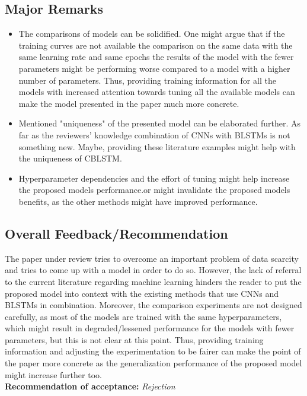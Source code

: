 \documentclass[a4paper,9pt]{article}
\begin{document}
\subsection{Major Remarks}
\begin{itemize}
    \item The comparisons of models can be solidified. One might argue that if the training curves are not available the comparison on the same data with the same learning rate and same epochs the results of the model with the fewer parameters might be performing worse compared to a model with a higher number of parameters. Thus, providing training information for all the models with increased attention towards tuning all the available models can make the model presented in the paper much more concrete.
    \item Mentioned "uniqueness" of the presented model can be elaborated further. As far as the reviewers' knowledge combination of CNNs with BLSTMs is not something new. Maybe, providing these literature examples might help with the uniqueness of CBLSTM.
    \item Hyperparameter dependencies and the effort of tuning might help increase the proposed models performance.or might invalidate the proposed models benefits, as the other methods might have improved performance.
\end{itemize}

\subsection{Overall Feedback/Recommendation}
The paper under review tries to overcome an important problem of data scarcity and tries to come up with a model in order to do so. However, the lack of referral to the current literature regarding machine learning hinders the reader to put the proposed model into context with the existing methods that use CNNs and BLSTMs in combination. Moreover, the comparison experiments are not designed carefully, as most of the models are trained with the same hyperparameters, which might result in degraded/lessened performance for the models with fewer parameters, but this is not clear at this point. Thus, providing training information and adjusting the experimentation to be fairer can make the point of the paper more concrete as the generalization performance of the proposed model might increase further too.
\\

\textbf{Recommendation of acceptance:} \textit{Rejection }
\end{document}
